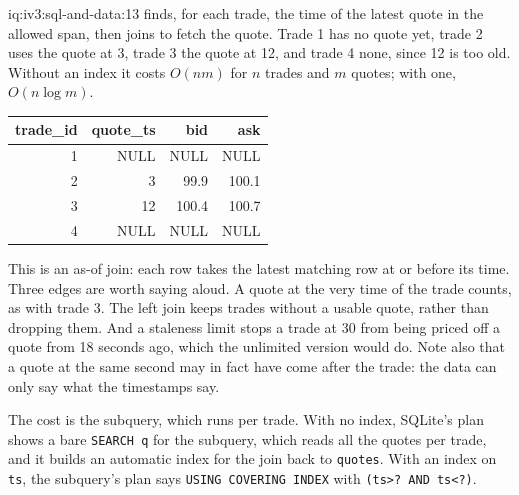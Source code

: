 \begin{solution}{iq:iv3:sql-and-data:13}
 finds, for each trade, the time of the latest quote in the allowed span, then joins to fetch the quote. Trade 1 has no quote yet, trade 2 uses the quote at 3, trade 3 the quote at 12, and trade 4 none, since 12 is too old. Without an index it costs $O(nm)$ for $n$ trades and $m$ quotes; with one, $O(n \log m)$.
\label{lst:iv3:sq:asofc}
\begin{center}\small
\begin{tabular}{rrrr}
trade\_id & quote\_ts & bid & ask\\\hline
1 & NULL & NULL & NULL\\
2 & 3 & 99.9 & 100.1\\
3 & 12 & 100.4 & 100.7\\
4 & NULL & NULL & NULL
\end{tabular}
\end{center}
This is an as-of join: each row takes the latest matching row at or before its time. Three edges are worth saying aloud. A quote at the very time of the trade counts, as with trade 3. The left join keeps trades without a usable quote, rather than dropping them. And a staleness limit stops a trade at 30 from being priced off a quote from 18 seconds ago, which the unlimited version would do. Note also that a quote at the same second may in fact have come after the trade: the data can only say what the timestamps say.

The cost is the subquery, which runs per trade. With no index, SQLite's plan shows a bare \texttt{SEARCH q} for the subquery, which reads all the quotes per trade, and it builds an automatic index for the join back to \texttt{quotes}. With an index on \texttt{ts}, the subquery's plan says \texttt{USING COVERING INDEX} with \texttt{(ts>? AND ts<?)}.

\end{solution}

